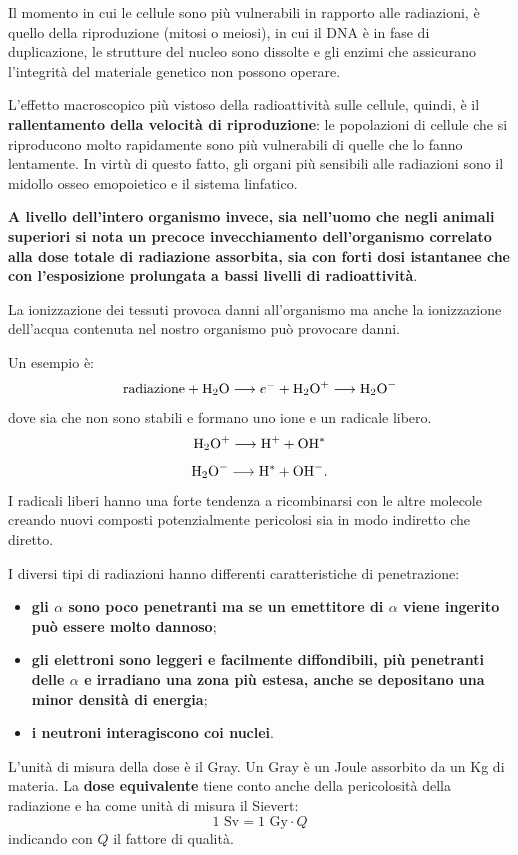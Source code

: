 \documentclass[a4paper,11pt,twoside,openany]{book}
\theoremstyle{definition}
\theoremstyle{plain}
\theoremstyle{plain}
\theoremstyle{definition}
\begin{document}
Il momento in cui le cellule sono più vulnerabili in rapporto alle radiazioni, è quello della riproduzione (mitosi o meiosi), in cui il DNA è in fase di duplicazione, le strutture del nucleo sono dissolte e gli enzimi che assicurano l'integrità del materiale genetico non possono operare.

L'effetto macroscopico più vistoso della radioattività sulle cellule, quindi, è il \textbf{rallentamento della velocità di riproduzione}: le popolazioni di cellule che si riproducono molto rapidamente sono più vulnerabili di quelle che lo fanno lentamente. In virtù di questo fatto, gli organi più sensibili alle radiazioni sono il midollo osseo emopoietico e il sistema linfatico.

\textbf{A livello dell'intero organismo invece, sia nell'uomo che negli animali superiori si nota un precoce invecchiamento dell'organismo correlato alla dose totale di radiazione assorbita, sia con forti dosi istantanee che con l'esposizione prolungata a bassi livelli di radioattività}.

La ionizzazione dei tessuti provoca danni all'organismo ma anche la ionizzazione dell'acqua contenuta nel nostro organismo può provocare danni.

Un esempio è: $$\textrm{radiazione}+\ce{H2O}\longrightarrow e^-+\ce{H2O+}\longrightarrow \ce{H2O-}$$ dove sia  che  non sono stabili e formano uno ione e un radicale libero. $$\ce{H2O+} \longrightarrow \ce{H+} +\ce{OH}^*$$ $$\ce{H2O-} \longrightarrow \ce{H}^* +\ce{OH-}.$$ I radicali liberi hanno una forte tendenza a ricombinarsi con le altre molecole creando nuovi composti potenzialmente pericolosi sia in modo indiretto che diretto.

I diversi tipi di radiazioni hanno differenti caratteristiche di penetrazione:
\begin{itemize}
\item \textbf{gli $\alpha$ sono poco penetranti ma se un emettitore di $\alpha$ viene ingerito può essere molto dannoso};
\item \textbf{gli elettroni sono leggeri e facilmente diffondibili, più penetranti delle $\alpha$ e irradiano una zona più estesa, anche se depositano una minor densità di energia};
\item \textbf{i neutroni interagiscono coi nuclei}.
\end{itemize}

L'unità di misura della dose è il Gray. Un Gray è un Joule assorbito da un Kg di materia. La \textbf{dose equivalente} tiene conto anche della pericolosità della radiazione e ha come unità di misura il Sievert: $$1 \textrm{ Sv} = 1 \textrm{ Gy}\cdot Q$$ indicando con $Q$ il fattore di qualità.
\end{document}
